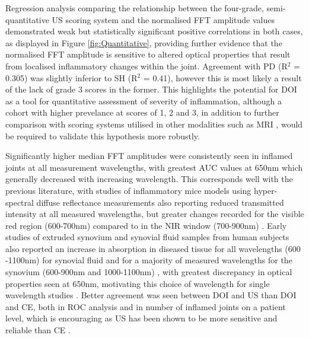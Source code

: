\documentclass[twoside]{bhamthesis}
\theoremstyle{definition}
\begin{document}
Regression analysis comparing the relationship between the four-grade, semi-quantitative US scoring system and the normalised FFT amplitude values demonstrated weak but statistically significant positive correlations in both cases, as displayed in Figure \ref{fig:Quantitative}, providing further evidence that the normalised FFT amplitude is sensitive to altered optical properties that result from localised inflammatory changes within the joint. Agreement with PD (R$^2$ = 0.305) was slightly inferior to SH (R$^2$ = 0.41), however this is most likely a result of the lack of grade 3 scores in the former. This highlights the potential for DOI as a tool for quantitative assessment of severity of inflammation, although a cohort with higher prevelance at scores of 1, 2 and 3, in addition to further comparison with scoring systems utilised in other modalities such as MRI \cite{ostergaard2003omeract}, would be required to validate this hypothesis more robustly. 

Significantly higher median FFT amplitudes were consistently seen in inflamed joints at all measurement wavelengths, with greatest AUC values at 650nm which generally decreased with increasing wavelength. This corresponds well with the previous literature, with studies of inflammatory mice models using hyper-spectral diffuse reflectance measurements also reporting reduced transmitted intensity at all measured wavelengths, but greater changes recorded for the visible red region (600-700nm) compared to in the NIR window (700-900nm) \cite{glinton2017diagnosing}. Early studies of extruded synovium and synovial fluid samples from human subjects also reported an increase in absorption in diseased tissue for all wavelengths (600 -1100nm) for synovial fluid and for a majority of measured wavelengths for the synovium (600-900nm and 1000-1100nm) \cite{beuthan1996diagnosis}, with greatest discrepancy in optical properties seen at 650nm, motivating this choice of wavelength for single wavelength studies \cite{hielscher2004sagittal}. Better agreement was seen between DOI and US than DOI and CE, both in ROC analysis and in number of inflamed joints on a patient level, which is encouraging as US has been shown to be more sensitive and reliable than CE \cite{wakefield2004should,scheel2006prospective,naredo2005assessment}.
\end{document}
